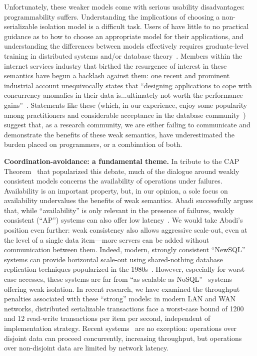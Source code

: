 \documentclass[9pt]{article}
\theoremstyle{definition}
\theoremstyle{remark}
\newcommand{\minihead}[1]{{\vspace{.4em}\noindent\textbf{#1.} }}
\begin{document}
Unfortunately, these weaker models come with serious usability disadvantages: programmability suffers. Understanding the implications of choosing a non-serializable isolation model is a difficult task. Users of have little to no practical guidance as to how to choose an appropriate model for their applications, and understanding the differences between models effectively requires graduate-level training in distributed systems and/or database theory~\cite{consistency-borders}. Members within the internet services industry that birthed the resurgence of interest in these semantics have begun a backlash against them: one recent and prominent industrial account unequivocally states that ``designing applications to cope with concurrency anomalies in their data is...ultimately not worth the performance gains''~\cite{f1}. Statements like these (which, in our experience, enjoy some popularity among practitioners and considerable acceptance in the database community~\cite{stonebraker-blog}) suggest that, as a research community, we are either failing to communicate and demonstrate the benefits of these weak semantics, have underestimated the burden placed on programmers, or a combination of both.

\minihead{Coordination-avoidance: a fundamental theme} In tribute to the CAP Theorem~\cite{gilbert-cap} that popularized this debate, much of the dialogue around weakly consistent models concerns the availability of operations under failures. Availability is an important property, but, in our opinion, a sole focus on availability undervalues the benefits of weak semantics. Abadi successfully argues that, while ``availability'' is only relevant in the presence of failures, weakly consistent (``AP'') systems can also offer low latency~\cite{pacelc}. We would take Abadi's position even further: weak consistency also allows aggressive scale-out, even at the level of a single data item---more servers can be added without communication between them. Indeed, modern, strongly consistent ``NewSQL'' systems can provide horizontal scale-out using shared-nothing database replication techniques popularized in the 1980s~\cite{sharednothing}. However, especially for worst-case accesses, these systems are far from ``as scalable as NoSQL''~\cite{f1} systems offering weak isolation. In recent research, we have examined the throughput penalties associated with these ``strong'' models: in modern LAN and WAN networks, distributed serializable transactions face a worst-case bound of 1200 and 12 read-write transactions per item per second, independent of implementation strategy. Recent systems~\cite{spanner,f1} are no exception: operations over disjoint data can proceed concurrently, increasing throughput, but operations over non-disjoint data are limited by network latency.
\end{document}
